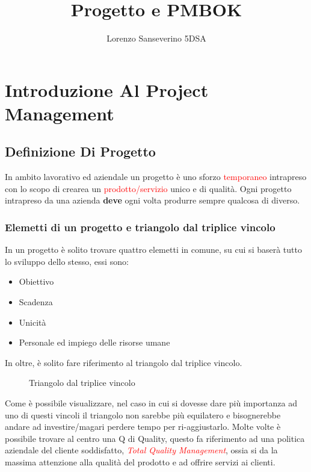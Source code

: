 \documentclass{report}
\title{Progetto e PMBOK}
\author{Lorenzo Sanseverino 5DSA}
\begin{document}
\tableofcontents
\maketitle




\chapter{Introduzione Al Project Management}
\section{Definizione Di Progetto}
In ambito lavorativo ed aziendale un progetto è uno sforzo \textcolor{red}{temporaneo} intrapreso con lo scopo di crearea un \textcolor{red}{prodotto/servizio} unico e di qualità.
Ogni progetto intrapreso da una azienda \textbf{deve} ogni volta produrre sempre qualcosa di diverso. 

\subsection{Elemetti di un progetto e triangolo dal triplice vincolo}
In un progetto è solito trovare quattro elemetti in comune, su cui si baserà tutto lo sviluppo dello stesso, essi sono:

\begin{itemize}
\item Obiettivo
\item Scadenza
\item Unicità
\item Personale ed impiego delle risorse umane
\end{itemize}

In oltre, è solito fare riferimento al triangolo dal triplice vincolo.
\begin{figure}[h]
\caption{Triangolo dal triplice vincolo}
\label{t}
\end{figure}
Come è possibile visualizzare, nel caso in cui si dovesse dare più importanza ad uno di questi vincoli il triangolo non sarebbe più equilatero e bisognerebbe andare ad investire/magari perdere tempo per ri-aggiustarlo.
Molte volte è possibile trovare al centro una Q di Quality, questo fa riferimento ad una politica aziendale del cliente soddisfatto, \textit{\textcolor{red}{Total Quality Management}}, ossia si da la massima attenzione alla qualità del prodotto e ad offrire servizi ai clienti.
\end{document}
